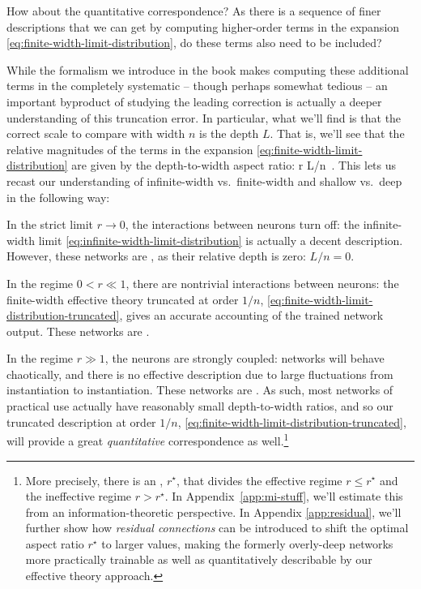 How about the quantitative correspondence? As there is a sequence of finer descriptions that we can get by computing higher-order terms in the expansion \eqref{eq:finite-width-limit-distribution}, do these terms also need to be included?
 
While the formalism we introduce in the book makes computing these additional terms in the  completely systematic -- though perhaps somewhat tedious -- an important byproduct of studying the leading correction is actually a deeper understanding of this truncation error. In particular, what we'll find is that the correct scale to compare with width $n$ is the depth $L$. That is, we'll see that the relative magnitudes of the terms in the expansion \eqref{eq:finite-width-limit-distribution} are given by the depth-to-width aspect ratio: 
\be
r \equiv L/n\, .
\ee
This lets us recast our understanding of infinite-width vs.~finite-width and shallow vs.~deep in the following way:
\bi
\item In the strict limit $r \to 0$, the interactions between neurons turn off: the infinite-width limit \eqref{eq:infinite-width-limit-distribution} is actually a decent description. However, these networks are , as their relative depth is zero: $L/n =0$. 
\item
In the regime $0 < r \ll 1$, there are nontrivial interactions between neurons: the finite-width effective theory truncated at order $1/n$, \eqref{eq:finite-width-limit-distribution-truncated}, gives an accurate accounting of the trained network output.
These networks are .
\item In the regime $ r \gg 1$, the neurons are strongly coupled: networks will behave chaotically,
and there is no effective description due to large fluctuations from instantiation to instantiation. These networks are .
\ei 
As such, most networks of practical use actually have reasonably small depth-to-width ratios, 
and so our
truncated description at order $1/n$, \eqref{eq:finite-width-limit-distribution-truncated}, will provide a great \emph{quantitative} correspondence as well.\footnote{More precisely, there is an , $r^{\star}$, that divides the effective regime $r \leq r^{\star}$ and the ineffective regime $r > r^{\star}$. In Appendix~\ref{app:mi-stuff}, we'll estimate this  from an information-theoretic perspective. In Appendix \ref{app:residual}, we'll further show how \emph{residual connections} can be introduced to shift the optimal aspect ratio $r^{\star}$ to larger values, making the formerly overly-deep networks 
more practically trainable as well as quantitatively describable by our 
effective theory approach.}


